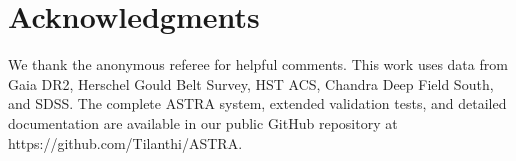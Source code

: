 \documentclass[usenatbib]{rasti}
\begin{document}
\section*{Acknowledgments}

We thank the anonymous referee for helpful comments. This work uses data from Gaia DR2, Herschel Gould Belt Survey, HST ACS, Chandra Deep Field South, and SDSS. The complete ASTRA system, extended validation tests, and detailed documentation are available in our public GitHub repository at https://github.com/Tilanthi/ASTRA.

\label{lastpage}



\end{document}
